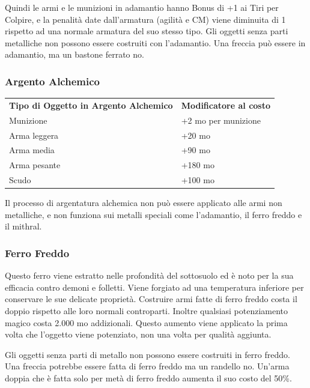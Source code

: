 \documentclass[a4paper,11pt,twoside,openany]{book}
\begin{document}
Quindi le armi e le munizioni in adamantio hanno Bonus di +1 ai Tiri per Colpire, e la penalità date dall'armatura (agilità e CM) viene diminuita di 1 rispetto ad una normale armatura del suo stesso tipo. Gli oggetti senza parti metalliche non possono essere costruiti con l'adamantio. Una freccia può essere in adamantio, ma un bastone ferrato
no.

\subsubsection{Argento Alchemico}

\label{argento-alchemico}

\begin{tabular}{ll}
	\toprule
	\textbf{Tipo di Oggetto in Argento Alchemico} & \textbf{Modificatore al costo}\\
	Munizione                      & +2 mo per munizione\\
	Arma leggera                   & +20 mo\\
	Arma media                     & +90 mo\\
	Arma pesante                   & +180 mo\\
	Scudo                         & +100 mo\\
\end{tabular}

Il processo di argentatura alchemica non può essere applicato alle armi non metalliche, e non funziona sui metalli speciali come l'adamantio, il ferro freddo e il mithral.

\subsubsection{Ferro Freddo}

\label{ferro-freddo}

Questo ferro viene estratto nelle profondità del sottosuolo ed è noto per la sua efficacia contro demoni e folletti. Viene forgiato ad una temperatura inferiore per conservare le sue delicate proprietà. Costruire armi fatte di ferro freddo costa il doppio rispetto alle loro normali controparti. Inoltre qualsiasi potenziamento magico costa 2.000 mo addizionali. Questo aumento viene applicato la prima volta che l'oggetto viene potenziato, non una volta per qualità aggiunta.

Gli oggetti senza parti di metallo non possono essere costruiti in ferro freddo. Una freccia potrebbe essere fatta di ferro freddo ma un randello no. Un'arma doppia che è fatta solo per metà di ferro freddo aumenta il suo costo del 50\%.
\end{document}
